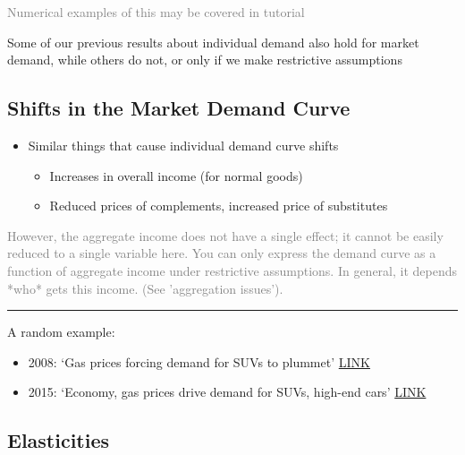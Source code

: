 \documentclass[]{article}
\providecommand{\tightlist}{%
  \setlength{\itemsep}{0pt}\setlength{\parskip}{0pt}}
\begin{document}
\textcolor{gray}{Numerical examples of this may be covered in tutorial}

Some of our previous results about individual demand also hold for
market demand, while others do not, or only if we make restrictive
assumptions

\hypertarget{shifts-in-the-market-demand-curve}{%
\subsection{Shifts in the Market Demand
Curve}\label{shifts-in-the-market-demand-curve}}

\begin{itemize}
\tightlist
\item
  Similar things that cause individual demand curve shifts

  \begin{itemize}
  \tightlist
  \item
    Increases in overall income (for normal goods)
  \item
    Reduced prices of complements, increased price of substitutes
  \end{itemize}
\end{itemize}

\textcolor{gray}{However, the aggregate income does not have a single effect; it cannot be easily reduced to a single variable here. You can only express the demand curve as a function of aggregate income under restrictive assumptions. In general, it depends *who* gets this income. (See 'aggregation issues').}

\begin{center}\rule{0.5\linewidth}{\linethickness}\end{center}

A random example:

\begin{itemize}
\item
  2008: `Gas prices forcing demand for SUVs to plummet'
  \href{http://www.thehour.com/wilton/article/Gas-prices-forcing-demand-for-SUVs-to-plummet-8257785.php}{LINK}
\item
  2015: `Economy, gas prices drive demand for SUVs, high-end cars'
  \href{http://www.sj-r.com/article/20150809/NEWS/150809569}{LINK}
\end{itemize}

\hypertarget{elasticities}{%
\subsection{Elasticities}\label{elasticities}}
\end{document}
